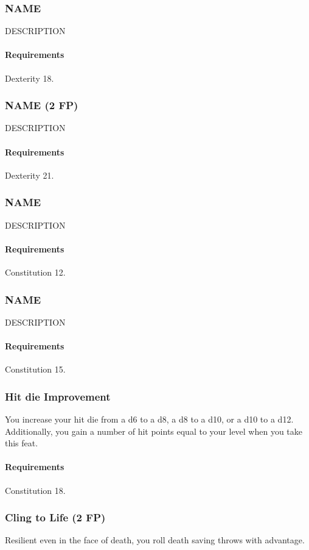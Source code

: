 \subsubsection{NAME} \label{feat::name}
    DESCRIPTION
    \paragraph{Requirements} Dexterity 18.
\subsubsection{NAME (2 FP)} \label{feat::name}
    DESCRIPTION
    \paragraph{Requirements} Dexterity 21.
\subsubsection{NAME} \label{feat::name}
    DESCRIPTION
    \paragraph{Requirements} Constitution 12.
\subsubsection{NAME} \label{feat::name}
    DESCRIPTION
    \paragraph{Requirements} Constitution 15.
\subsubsection{Hit die Improvement} \label{feat::hitdieimprovement}
    You increase your hit die from a d6 to a d8, a d8 to a d10, or a d10 to a d12.
    Additionally, you gain a number of hit points equal to your level when you take this feat.
    \paragraph{Requirements} Constitution 18.
\subsubsection{Cling to Life (2 FP)} \label{feat::clingtolife}
    Resilient even in the face of death, you roll death saving throws with advantage.

